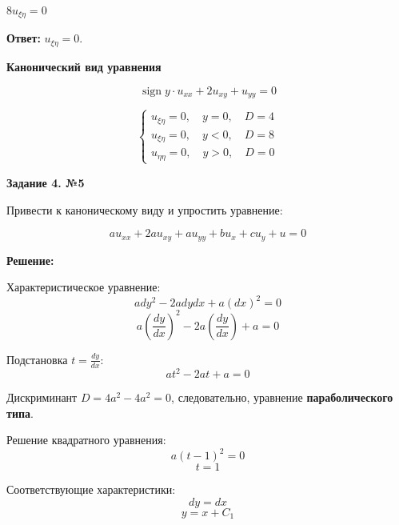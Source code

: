 \documentclass[a4paper,12pt]{article}
\begin{document}
$8u_{\xi\eta} = 0$

\textbf{Ответ:} $ u_{\xi\eta} = 0. $

\begin{center}
\noindent \textbf{Канонический вид уравнения}
\end{center}

\[
\operatorname{sign} y \cdot u_{xx} + 2 u_{xy} + u_{yy} = 0
\]

\begin{equation*}
    \begin{cases}
        u_{\xi\eta} = 0, \quad y = 0, \quad D = 4 \\
        u_{\xi\eta} = 0, \quad y < 0, \quad D = 8 \\
        u_{\eta\eta} = 0, \quad y > 0, \quad D = 0
    \end{cases}
\end{equation*}

\begin{center}    
\noindent \textbf{Задание 4. №5}
\end{center}
Привести к каноническому виду и упростить уравнение:

\begin{equation*}
    a u_{xx} + 2a u_{xy} + a u_{yy} + b u_x + c u_y + u = 0
\end{equation*}

\textbf{Решение:}

Характеристическое уравнение:
\begin{equation*}
    a dy^2 - 2a dy dx + a (dx)^2 = 0
\end{equation*}
\begin{equation*}
    a \left(\frac{dy}{dx}\right)^2 - 2a \left(\frac{dy}{dx}\right) + a = 0
\end{equation*}

Подстановка $t = \frac{dy}{dx}$:
\begin{equation*}
    a t^2 - 2a t + a = 0
\end{equation*}

Дискриминант $D = 4a^2 - 4a^2 = 0$, следовательно, уравнение \textbf{параболического типа}.

Решение квадратного уравнения:
\begin{equation*}
    a (t - 1)^2 = 0
\end{equation*}
\begin{equation*}
    t = 1
\end{equation*}

Соответствующие характеристики:
\begin{equation*}
    dy = dx
\end{equation*}
\begin{equation*}
    y = x + C_1
\end{equation*}
\end{document}
